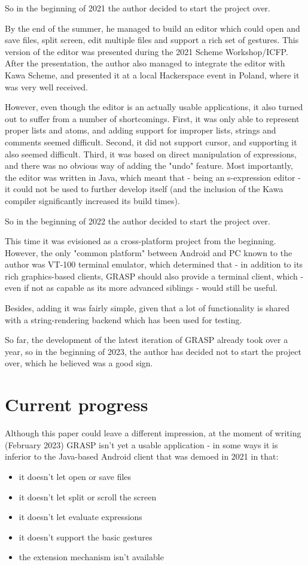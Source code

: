 \documentclass[11pt]{article}
\begin{document}
So in the beginning of 2021 the author decided
to start the project over.

By the end of the summer, he managed to build an editor
which could open and save files, split screen,
edit multiple files and support a rich set of gestures.
This version of the editor was presented during the 2021 Scheme
Workshop/ICFP. After the presentation, the author
also managed to integrate the editor with Kawa Scheme,
and presented it at a local Hackerspace event in Poland,
where it was very well received.

However, even though the editor is an actually usable
applications, it also turned out to suffer from a number
of shortcomings. First, it was only able to represent
proper lists and atoms, and adding support for improper lists,
strings and comments seemed difficult. Second, it did not support
cursor, and supporting it also seemed difficult.
Third, it was based on direct manipulation of expressions,
and there was no obvious way of adding the "undo" feature.
Most importantly, the editor was written in Java,
which meant that - being an s-expression editor - it could
not be used to further develop itself (and the inclusion
of the Kawa compiler significantly increased its build times).

So in the beginning of 2022 the author decided
to start the project over.

This time it was evisioned as a cross-platform project
from the beginning. However, the only "common platform"
between Android and PC known to the author was VT-100
terminal emulator, which determined that - in addition
to its rich graphics-based clients, GRASP should also provide
a terminal client, which - even if not as capable
as its more advanced siblings - would still be useful.

Besides, adding it was fairly simple, given that a lot of
functionality is shared with a string-rendering backend
which has been used for testing.

So far, the development of the latest iteration of GRASP
already took over a year, so in the beginning of 2023,
the author has decided not to start the project over,
which he believed was a good sign.

\section{Current progress}
\label{sec:org9c32af8}

Although this paper could leave a different impression,
at the moment of writing (February 2023) GRASP isn't yet 
a usable application - in some ways it is inferior to the
Java-based Android client that was demoed in 2021
in that:
\begin{itemize}
\item it doesn't let open or save files
\item it doesn't let split or scroll the screen
\item it doesn't let evaluate expressions
\item it doesn't support the basic gestures
\item the extension mechanism isn't available
\end{itemize}
\end{document}
